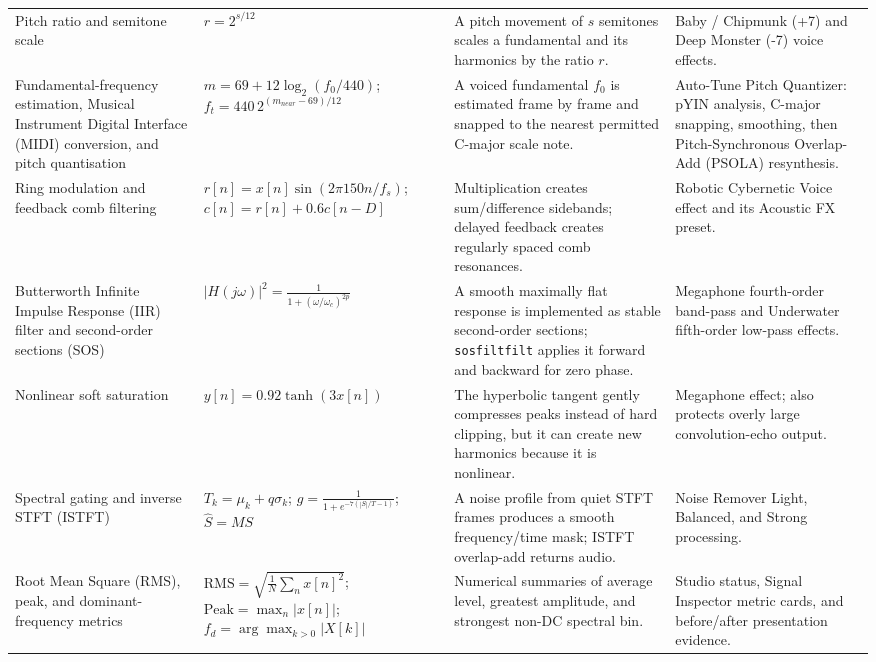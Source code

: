 \documentclass[11pt,a4paper]{article}
\newcommand{\code}[1]{\texttt{#1}}
\begin{document}
{\begin{longtable}{@{}p{.19\linewidth}p{.26\linewidth}p{.25\linewidth}p{.22\linewidth}@{}}
Pitch ratio and semitone scale & \(r=2^{s/12}\) & A pitch movement of \(s\) semitones scales a fundamental and its harmonics by the ratio \(r\). & Baby / Chipmunk (+7) and Deep Monster (-7) voice effects.\\

Fundamental-frequency estimation, Musical Instrument Digital Interface (MIDI) conversion, and pitch quantisation & \(m=69+12\log_2(f_0/440)\); \(f_t=440\,2^{(m_{near}-69)/12}\) & A voiced fundamental \(f_0\) is estimated frame by frame and snapped to the nearest permitted C-major scale note. & Auto-Tune Pitch Quantizer: pYIN analysis, C-major snapping, smoothing, then Pitch-Synchronous Overlap-Add (PSOLA) resynthesis.\\

Ring modulation and feedback comb filtering & \(r[n]=x[n]\sin(2\pi150n/f_s)\); \(c[n]=r[n]+0.6c[n-D]\) & Multiplication creates sum/difference sidebands; delayed feedback creates regularly spaced comb resonances. & Robotic Cybernetic Voice effect and its Acoustic FX preset.\\

Butterworth Infinite Impulse Response (IIR) filter and second-order sections (SOS) & \(|H(j\omega)|^2=\frac{1}{1+(\omega/\omega_c)^{2p}}\) & A smooth maximally flat response is implemented as stable second-order sections; \code{sosfiltfilt} applies it forward and backward for zero phase. & Megaphone fourth-order band-pass and Underwater fifth-order low-pass effects.\\

Nonlinear soft saturation & \(y[n]=0.92\tanh(3x[n])\) & The hyperbolic tangent gently compresses peaks instead of hard clipping, but it can create new harmonics because it is nonlinear. & Megaphone effect; also protects overly large convolution-echo output.\\

Spectral gating and inverse STFT (ISTFT) & \(T_k=\mu_k+q\sigma_k\); \(g=\frac1{1+e^{-7(|S|/T-1)}}\); \(\hat S=MS\) & A noise profile from quiet STFT frames produces a smooth frequency/time mask; ISTFT overlap-add returns audio. & Noise Remover Light, Balanced, and Strong processing.\\

Root Mean Square (RMS), peak, and dominant-frequency metrics & \(\mathrm{RMS}=\sqrt{\frac1N\sum_nx[n]^2}\); \(\mathrm{Peak}=\max_n|x[n]|\); \(f_d=\arg\max_{k>0}|X[k]|\) & Numerical summaries of average level, greatest amplitude, and strongest non-DC spectral bin. & Studio status, Signal Inspector metric cards, and before/after presentation evidence.\\
\end{longtable}
}
\end{document}
